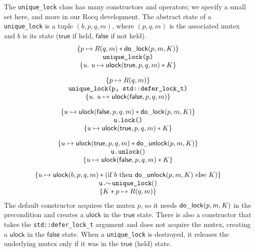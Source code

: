 \documentclass[acmsmall,screen,review,anonymous]{acmart}
\begin{document}
The \lstinline{unique_lock} class has many constructors and operators; we specify a small set here, and more in our Rocq development. The abstract state of a \lstinline{unique_lock} is a tuple $(b, p, q, m)$, where $(p, q, m)$ is the associated mutex and $b$ is its state ($\mathsf{true}$ if held, $\mathsf{false}$ if not held).
\[\begin{array}{c}%
\{p \mapsto R(q, m) \ast \dolock{p}{m}{K}\}\\ \texttt{unique\_lock(p)}\\ \{u.\ u \mapsto \ulock(\mathsf{true}, p, q, m) \ast K\} \vspace{1em}\\
\{p \mapsto R(q, m)\}\\ \texttt{unique\_lock(p, std::defer\_lock\_t)}\\ \{u.\ u \mapsto \ulock(\mathsf{false}, p, q, m)\} \vspace{1em}\\
\{u \mapsto \ulock(\mathsf{false}, p, q, m)\ast \dolock{p}{m}{K}\}\\ {\texttt{u.lock()}} \\ \{u \mapsto \ulock(\mathsf{true}, p, q, m) \ast K\}  \vspace{1em}\\
    \{u \mapsto \ulock(\mathsf{true}, p, q, m) \ast \dounlock{p}{m}{K}\}\\ {\texttt{u.unlock}()}\\
    \{u \mapsto \ulock(\mathsf{false}, p, q, m) \ast K\}  \vspace{1em} \\
\{u \mapsto \ulock(b, p, q, m) \ast (\text{if } b \text{ then } \dounlock{p}{m}{K} \text{ else } K)\}\\ \texttt{u.}\!\!\sim\!\texttt{unique\_lock}()\\ \{K \ast p \mapsto R(q, m)\}
\end{array}\]
The default constructor acquires the mutex $p$, so it needs $\mathsf{do\_lock}(p, m, K)$ in the precondition and creates a $\mathsf{ulock}$ in the $\mathsf{true}$ state. There is also a constructor that takes the \lstinline{std::defer_lock_t} argument and does not acquire the mutex, creating a $\mathsf{ulock}$ in the $\mathsf{false}$ state. When a \lstinline{unique_lock} is destroyed, it releases the underlying mutex only if it was in the $\mathsf{true}$ (held) state.
\end{document}
